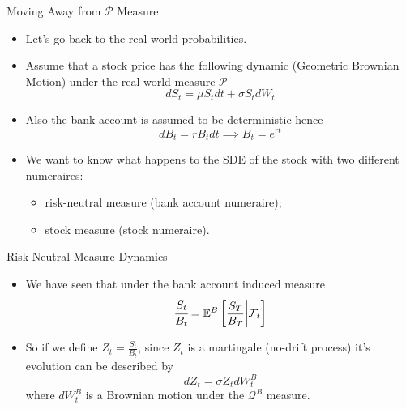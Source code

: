 \documentclass{beamer}
\begin{document}

\begin{frame}{Moving Away from $\mathcal{P}$ Measure}
\begin{itemize}
	\item Let's go back to the real-world probabilities.
	\item Assume that a stock price has the following dynamic (Geometric Brownian Motion) under the real-world measure $\mathcal{P}$
	\begin{equation*}
	dS_t = \mu S_t dt + \sigma S_t dW_t
	\end{equation*}
	\item Also the bank account is assumed to be deterministic hence
	\begin{equation*}
	dB_t = rB_tdt\implies B_t = e^{rt}
	\end{equation*}
	\item We want to know what happens to the SDE of the stock with two different numeraires:
	\begin{itemize}
		\item risk-neutral measure (bank account numeraire);
		\item stock measure (stock numeraire).
	\end{itemize}
\end{itemize}
\end{frame}

\begin{frame}{Risk-Neutral Measure Dynamics}
	\begin{itemize}
	\item We have seen that under the bank account induced measure 
	\begin{equation*}
	\cfrac{S_t}{B_t} = \mathbb{E}^B\left[\frac{S_T}{B_T}\bigg|\mathcal{F}_t\right]
	\end{equation*}
	\item So if we define $Z_t=\frac{S_t}{B_t}$, since $Z_t$ is a martingale (no-drift process) it's evolution can be described by
	\begin{equation}
	dZ_t = \sigma Z_t dW_t^B
	\label{eq:z_martingale1}
	\end{equation}
	where $dW_t^B$ is a Brownian motion under the $\mathcal{Q}^B$ measure.
\end{itemize}
\end{frame}
\end{document}
